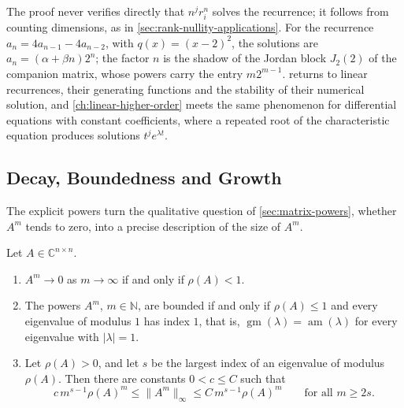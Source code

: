 The proof never verifies directly that $n^jr_i^n$ solves the recurrence; it follows from counting dimensions, as in \cref{sec:rank-nullity-applications}. For the recurrence $a_n=4a_{n-1}-4a_{n-2}$, with $q(x)=(x-2)^2$, the solutions are $a_n=(\alpha+\beta n)2^n$; the factor $n$ is the shadow of the Jordan block $J_2(2)$ of the companion matrix, whose powers carry the entry $m2^{m-1}$.  returns to linear recurrences, their generating functions and the stability of their numerical solution, and \cref{ch:linear-higher-order} meets the same phenomenon for differential equations with constant coefficients, where a repeated root of the characteristic equation produces solutions $t^je^{\lambda t}$.

\subsection{Decay, Boundedness and Growth}

The explicit powers turn the qualitative question of \cref{sec:matrix-powers}, whether $A^m$ tends to zero, into a precise description of the size of $A^m$.

\begin{theorem}
\label{thm:powers-size}
Let $A\in\mathbb C^{n\times n}$.
\begin{enumerate}
\item $A^m\to0$ as $m\to\infty$ if and only if $\rho(A)<1$.
\item The powers $A^m$, $m\in\mathbb N$, are bounded if and only if $\rho(A)\le1$ and every eigenvalue of modulus $1$ has index $1$, that is, $\operatorname{gm}(\lambda)=\operatorname{am}(\lambda)$ for every eigenvalue with $|\lambda|=1$.
\item Let $\rho(A)>0$, and let $s$ be the largest index of an eigenvalue of modulus $\rho(A)$. Then there are constants $0<c\le C$ such that
\[
c\,m^{s-1}\rho(A)^m\le\|A^m\|_\infty\le C\,m^{s-1}\rho(A)^m\qquad\text{for all }m\ge2s .
\]
\end{enumerate}
\end{theorem}

